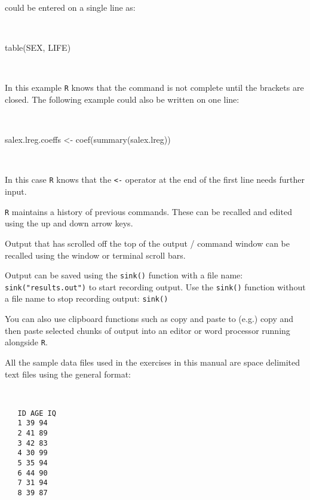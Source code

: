 \documentclass[
  12pt,
  a4paper]{book}
\newenvironment{Shaded}{\begin{snugshade}}{\end{snugshade}}
\newcommand{\FunctionTok}[1]{\textcolor[rgb]{0.00,0.00,0.00}{#1}}
\newcommand{\NormalTok}[1]{#1}
\newcommand{\OtherTok}[1]{\textcolor[rgb]{0.56,0.35,0.01}{#1}}
\begin{document}
could be entered on a single line as:

~

\begin{Shaded}
\begin{Highlighting}[]
\FunctionTok{table}\NormalTok{(SEX, LIFE)}
\end{Highlighting}
\end{Shaded}

~

In this example \texttt{R} knows that the command is not complete until the brackets are closed. The following example could also be written on one line:

~

\begin{Shaded}
\begin{Highlighting}[]
\NormalTok{salex.lreg.coeffs }\OtherTok{\textless{}{-}}
  \FunctionTok{coef}\NormalTok{(}\FunctionTok{summary}\NormalTok{(salex.lreg))}
\end{Highlighting}
\end{Shaded}

~

In this case \texttt{R} knows that the \texttt{\textless{}-} operator at the end of the first line needs further input.

\texttt{R} maintains a history of previous commands. These can be recalled and edited using the up and down arrow
keys.

Output that has scrolled off the top of the output / command window can be recalled using the window or terminal scroll bars.

Output can be saved using the \texttt{sink()} function with a file name: \texttt{sink("results.out")} to start recording output. Use the \texttt{sink()} function without a file name to stop recording output: \texttt{sink()}

You can also use clipboard functions such as copy and paste to (e.g.) copy and then paste selected chunks of output into an editor or word processor running alongside \texttt{R}.

All the sample data files used in the exercises in this manual are space delimited text files using the general
format:

~

\begin{verbatim}
   ID AGE IQ
   1 39 94
   2 41 89
   3 42 83
   4 30 99
   5 35 94
   6 44 90
   7 31 94
   8 39 87
\end{verbatim}

~
\end{document}
